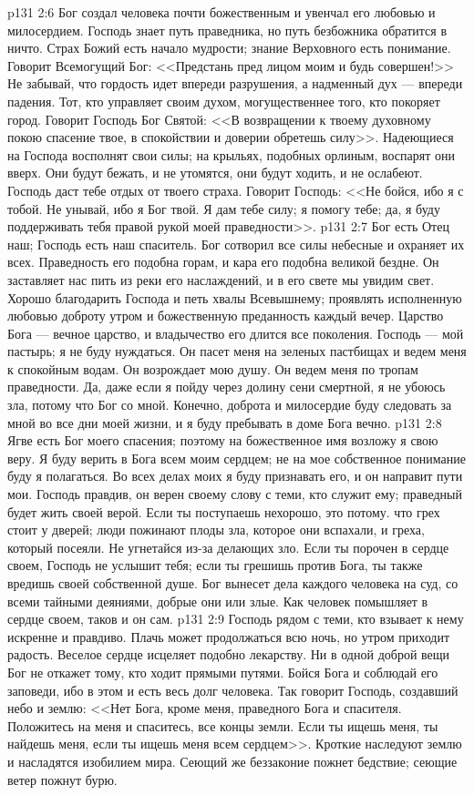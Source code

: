 \vs p131 2:6 Бог создал человека почти божественным и увенчал его любовью и милосердием. Господь знает путь праведника, но путь безбожника обратится в ничто. Страх Божий есть начало мудрости; знание Верховного есть понимание. Говорит Всемогущий Бог: <<Предстань пред лицом моим и будь совершен!>> Не забывай, что гордость идет впереди разрушения, а надменный дух --- впереди падения. Тот, кто управляет своим духом, могущественнее того, кто покоряет город. Говорит Господь Бог Святой: <<В возвращении к твоему духовному покою спасение твое, в спокойствии и доверии обретешь силу>>. Надеющиеся на Господа восполнят свои силы; на крыльях, подобных орлиным, воспарят они вверх. Они будут бежать, и не утомятся, они будут ходить, и не ослабеют. Господь даст тебе отдых от твоего страха. Говорит Господь: <<Не бойся, ибо я с тобой. Не унывай, ибо я Бог твой. Я дам тебе силу; я помогу тебе; да, я буду поддерживать тебя правой рукой моей праведности>>.
\vs p131 2:7 Бог есть Отец наш; Господь есть наш спаситель. Бог сотворил все силы небесные и охраняет их всех. Праведность его подобна горам, и кара его подобна великой бездне. Он заставляет нас пить из реки его наслаждений, и в его свете мы увидим свет. Хорошо благодарить Господа и петь хвалы Всевышнему; проявлять исполненную любовью доброту утром и божественную преданность каждый вечер. Царство Бога --- вечное царство, и владычество его длится все поколения. Господь --- мой пастырь; я не буду нуждаться. Он пасет меня на зеленых пастбищах и ведем меня к спокойным водам. Он возрождает мою душу. Он ведем меня по тропам праведности. Да, даже если я пойду через долину сени смертной, я не убоюсь зла, потому что Бог со мной. Конечно, доброта и милосердие буду следовать за мной во все дни моей жизни, и я буду пребывать в доме Бога вечно.
\vs p131 2:8 Ягве есть Бог моего спасения; поэтому на божественное имя возложу я свою веру. Я буду верить в Бога всем моим сердцем; не на мое собственное понимание буду я полагаться. Во всех делах моих я буду признавать его, и он направит пути мои. Господь правдив, он верен своему слову с теми, кто служит ему; праведный будет жить своей верой. Если ты поступаешь нехорошо, это потому. что грех стоит у дверей; люди пожинают плоды зла, которое они вспахали, и греха, который посеяли. Не угнетайся из\hyp{}за делающих зло. Если ты порочен в сердце своем, Господь не услышит тебя; если ты грешишь против Бога, ты также вредишь своей собственной душе. Бог вынесет дела каждого человека на суд, со всеми тайными деяниями, добрые они или злые. Как человек помышляет в сердце своем, таков и он сам.
\vs p131 2:9 Господь рядом с теми, кто взывает к нему искренне и правдиво. Плачь может продолжаться всю ночь, но утром приходит радость. Веселое сердце исцеляет подобно лекарству. Ни в одной доброй вещи Бог не откажет тому, кто ходит прямыми путями. Бойся Бога и соблюдай его заповеди, ибо в этом и есть весь долг человека. Так говорит Господь, создавший небо и землю: <<Нет Бога, кроме меня, праведного Бога и спасителя. Положитесь на меня и спаситесь, все концы земли. Если ты ищешь меня, ты найдешь меня, если ты ищешь меня всем сердцем>>. Кроткие наследуют землю и насладятся изобилием мира. Сеющий же беззаконие пожнет бедствие; сеющие ветер пожнут бурю.
